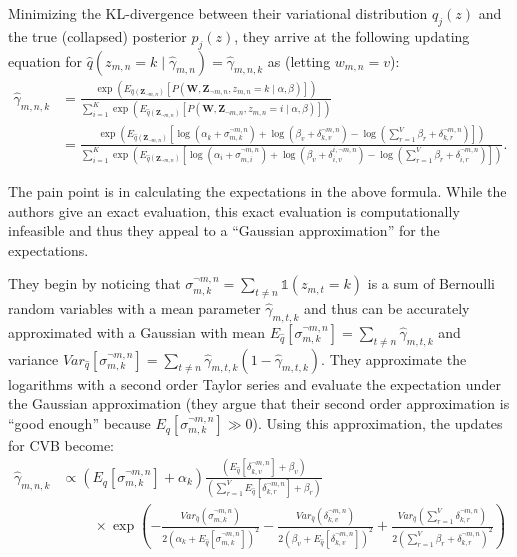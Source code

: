 \documentclass[11pt]{article}
\begin{document}
Minimizing the KL-divergence between their variational distribution $q_j(z)$
and the true (collapsed) posterior $p_j(z)$, they arrive at the following
updating equation for $\hat{q}(z_{m,n} = k \mid \hat{\gamma}_{m,n}) =
\hat{\gamma}_{m,n,k}$ as (letting $w_{m,n} = v$):
\begin{align}
  \hat{\gamma}_{m,n,k} &=
  \frac{\exp\left(E_{\hat{q}(\mathbf{Z}_{\neg m,n})}\left[P(\mathbf{W},
  \mathbf{Z}_{\neg m,n}, z_{m,n} = k \mid \alpha, \beta)\right]\right)}
  {\sum_{i=1}^K \exp\left(E_{\hat{q}(\mathbf{Z}_{\neg m,n})}\left[P(\mathbf{W},
  \mathbf{Z}_{\neg m,n}, z_{m,n} = i \mid \alpha, \beta)\right]\right)}\\
  &= \frac{\exp\left(E_{\hat{q}(\mathbf{Z}_{\neg m,n})}\left[
  \log(\alpha_k + \sigma_{m,k}^{\neg m,n})
  + \log(\beta_v + \delta_{k,v}^{\neg m,n})
  - \log(\sum_{r=1}^V \beta_r + \delta_{k,r}^{\neg m,n})\right]\right)}
  {\sum_{i=1}^K \exp\left(E_{\hat{q}(\mathbf{Z}_{\neg m,n})}\left[
      \log(\alpha_i + \sigma_{m,i}^{\neg m,n})
      + \log(\beta_v + \delta_{i,v}^{i,\neg m,n})
    - \log(\sum_{r=1}^V \beta_r + \delta_{i,r}^{\neg m,n})
  \right]\right)}.
\end{align}

The pain point is in calculating the expectations in the above formula.
While the authors give an exact evaluation, this exact evaluation is
computationally infeasible and thus they appeal to a ``Gaussian
approximation'' for the expectations.

They begin by noticing that $\sigma_{m,k}^{\neg m,n} = \sum_{t \neq n}
\mathbb{1}(z_{m,t} = k)$ is a sum of Bernoulli random variables with a mean
parameter $\hat{\gamma}_{m,t,k}$ and thus can be accurately approximated
with a Gaussian with mean $E_{\hat{q}}[\sigma_{m,k}^{\neg m,n}] =
\sum_{t\neq n} \hat{\gamma}_{m,t,k}$ and variance
$Var_{\hat{q}}[\sigma_{m,k}^{\neg m,n}] = \sum_{t\neq n}
\hat{\gamma}_{m,t,k}(1-\hat{\gamma}_{m,t,k})$. They approximate the
logarithms with a second order Taylor series and evaluate the expectation
under the Gaussian approximation (they argue that their second order
approximation is ``good enough'' because $E_{\hat{q}}[\sigma_{m,k}^{\neg
m,n}] \gg 0$). Using this approximation, the updates for CVB become:
\begin{align}
  \hat{\gamma}_{m,n,k} &\propto
  \left(E_{\hat{q}}[\sigma_{m,k}^{\neg m,n}] + \alpha_k\right)
  \frac{\left(E_{\hat{q}}[\delta_{k,v}^{\neg m,n}] + \beta_v\right)}
  {\left(\sum_{r=1}^V E_{\hat{q}}[\delta_{k,r}^{\neg m,n}] +
  \beta_r\right)}\nonumber\\
  &\quad\quad\;
  \times\exp\left(
    -\frac{Var_{\hat{q}}(\sigma_{m,k}^{\neg m,n})}
    {2\left(\alpha_k + E_{\hat{q}}[\sigma_{m,k}^{\neg m,n}]\right)^2}
    -\frac{Var_{\hat{q}}(\delta_{k,v}^{\neg m,n})}
    {2\left(\beta_v + E_{\hat{q}}[\delta_{k,v}^{\neg m,n}]\right)^2}
    +\frac{Var_{\hat{q}}\left(\sum_{r=1}^V \delta_{k,r}^{\neg m,n}\right)}
    {2\left(\sum_{r=1}^V \beta_r + \delta_{k,r}^{\neg m,n}\right)^2}
  \right)
  \label{eqn:cvb}
\end{align}
\end{document}
